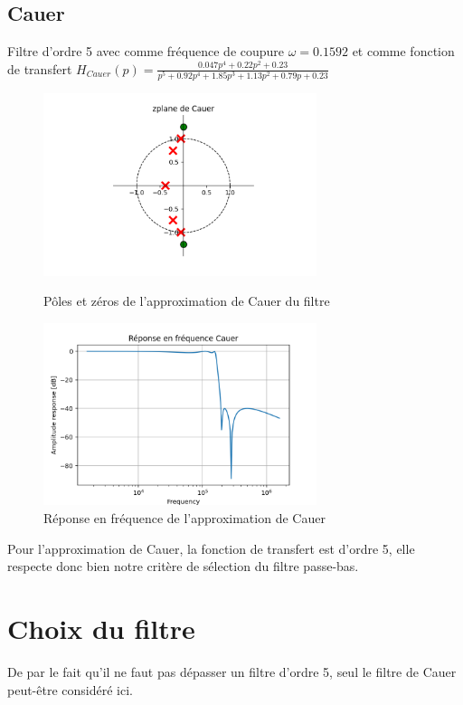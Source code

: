 \documentclass[a4paper,12pt,oneside]{report}	%
\begin{document}
        \subsection{Cauer}
            Filtre d'ordre 5 avec comme fréquence de coupure $\omega = 0.1592$ et comme fonction de transfert $H_{Cauer}(p) = \frac{0.047p^4 + 0.22p^2 + 0.23}{p^5 + 0.92p^4 + 1.85p^3 + 1.13p^2 + 0.79p + 0.23}$
            \begin{figure}[h!]
                \centering
                \includegraphics[width = 8cm]{code-projet-python/2.0.0 - zplane de Cauer.png}
                \caption{Pôles et zéros de l'approximation de Cauer du filtre}
                \label{fig:zplane-Cauer}
                \includegraphics[width = 8cm]{code-projet-python/2.0.0 - Réponse en fréquence Cauer.png}
                \caption{Réponse en fréquence de l'approximation de Cauer}
                \label{fig:repfreq-Cauer}
            \end{figure}
            
            Pour l’approximation de Cauer, la fonction de transfert est d'ordre 5, elle respecte donc bien notre critère de sélection du filtre passe-bas.
\newpage
    \section{Choix du filtre}
        De par le fait qu'il ne faut pas dépasser un filtre d'ordre 5, seul le filtre de Cauer peut-être considéré ici. 
\end{document}
